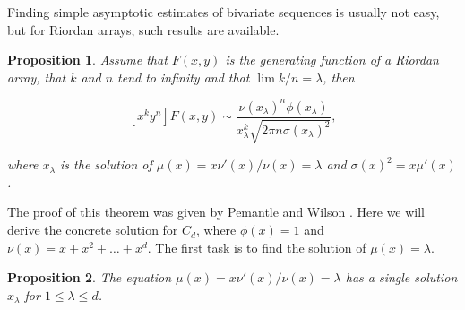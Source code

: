 \documentclass{article}
\newtheorem{proposition}{Proposition}
\begin{document}
Finding simple asymptotic estimates of bivariate sequences is usually not
easy, but for Riordan arrays, such results are available.

\begin{proposition}
\label{th:PW}
Assume that $F(x,y)$ is the generating function of a Riordan array, that
$k$ and $n$ tend to infinity and that $\lim k/n = \lambda$, then

\begin{equation}
\label{eq:Cd}
[x^ky^n]F(x,y) \sim \frac{\nu(x_\lambda)^n\phi(x_\lambda)}
  {x_\lambda^k\sqrt{2\pi n \sigma(x_\lambda)^2}},
\end{equation}

\noindent
where $x_\lambda$ is the solution of
$\mu(x) = x\nu'(x)/\nu(x) = \lambda$ and $\sigma(x)^2 = x \mu'(x)$.
\end{proposition}

The proof of this theorem was given by Pemantle and Wilson
\cite{PemWil08}. Here we will derive the concrete solution for $C_d$,
where $\phi(x) = 1$ and $\nu(x) = x + x^2 + \ldots +x^d$. The first task
is to find the solution of $\mu(x) = \lambda$.

\begin{proposition}
\label{th:mu}
The equation $\mu(x) = x\nu'(x)/\nu(x) = \lambda$ has a single solution
$x_\lambda$ for $1 \leq \lambda \leq d$.
\end{proposition}
\end{document}
